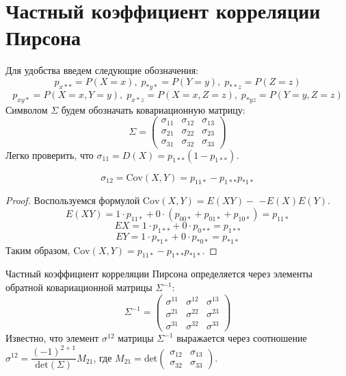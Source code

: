 \section{Частный коэффициент корреляции Пирсона}
Для удобства введем следующие обозначения: $$p_{x**}=P(X=x), \; p_{*y*}=P(Y=y), \; p_{**z}=P(Z=z)$$
$$p_{xy*}=P(X=x, Y=y), \; p_{x*z}=P(X=x, Z=z), \; p_{*yz}=P(Y=y, Z=z)$$
Символом $\Sigma$ будем обозначать ковариационную матрицу:
$$\Sigma =
    \begin{pmatrix}
        \sigma_{11} & \sigma_{12} & \sigma_{13} \\
        \sigma_{21} & \sigma_{22} & \sigma_{23} \\
        \sigma_{31} & \sigma_{32} & \sigma_{33}
    \end{pmatrix}
$$
Легко проверить, что $\sigma_{11}=D(X) = p_{1**}(1-p_{1**})$.

\begin{lemma}
    $$\sigma_{12}=\text{Cov}(X,Y)=p_{11*}-p_{1**}p_{*1*}$$
\end{lemma}

\begin{proof}
    Воспользуемся формулой $\text{Cov}(X,Y)=E(X Y)-$ $-E(X)E(Y)$.
    $$E(X Y) = 1 \cdot p_{11*} + 0 \cdot (p_{00*} + p_{01*} + p_{10*})=p_{11*}$$
    $$EX = 1 \cdot p_{1**} + 0 \cdot p_{0**}=p_{1**}$$
    $$ EY = 1 \cdot p_{*1*} + 0 \cdot p_{*0*} = p_{*1*}$$
    Таким образом, $\text{Cov}(X,Y)=p_{11*}-p_{1**}p_{*1*}$.
\end{proof}

Частный коэффициент корреляции Пирсона определяется через элементы обратной ковариационной матрицы $\Sigma^{-1}$:
$$
    \Sigma^{-1}=\begin{pmatrix}
        \sigma^{11} & \sigma^{12} & \sigma^{13} \\
        \sigma^{21} & \sigma^{22} & \sigma^{23} \\
        \sigma^{31} & \sigma^{32} & \sigma^{33}
    \end{pmatrix}
$$
Известно, что элемент $\sigma^{12}$ матрицы $\Sigma^{-1}$ выражается через соотношение
$\sigma^{12}=\dfrac{(-1)^{2+1}}{\text{det} (\Sigma)}M_{21}$, где
$
    M_{21}=\text{det}
    \begin{pmatrix}
        \sigma_{12} & \sigma_{13} \\
        \sigma_{32} & \sigma_{33}
    \end{pmatrix}
$.

